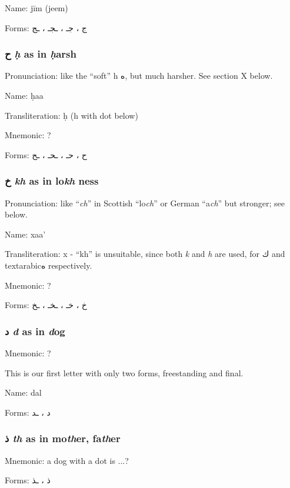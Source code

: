\documentclass[11pt]{article}
\begin{document}
\noindent Name: jīm (jeem)

\noindent Forms: \textarabic{ج ، جـ ، ـجـ ، ـج}

\subsubsection{ \textarabic{ح} \textit{ḥ} as in \textit{ḥ}arsh}
Pronunciation: like the ``soft'' h \textarabic{ه}, but much harsher.
See section X below.

\noindent Name: ḥaa

\noindent Transliteration: ḥ (h with dot below)

\noindent Mnemonic:  ?

\noindent Forms: \textarabic{ح ، حـ ، ـحـ ، ـح}

\subsubsection{ \textarabic{خ} \textit{kh} as in lo\textit{kh} ness}
Pronunciation: like ``\textit{ch}'' in Scottish ``lo\textit{ch}'' or
German ``a\textit{ch}'' but stronger; see below.

\noindent Name: xaa'

\noindent Transliteration: x - ``kh'' is unsuitable, since both
\textit{k} and \textit{h} are used, for \textarabic{ك} and
textarabic{ه} respectively.

\noindent Mnemonic:  ?

\noindent Forms: \textarabic{خ ، خـ ، ـخـ ، ـخ}

\subsubsection{ \textarabic{د} \textit{d} as in \textit{d}og}
Mnemonic:  ?

This is our first letter with only two forms, freestanding and final.

\noindent Name: dal

\noindent Forms: \textarabic{د ، ـد}

\subsubsection{ \textarabic{ذ} \textit{th} as in mo\textit{th}er, fa\textit{th}er}
Mnemonic:  a dog with a dot is ...?

\noindent Forms: \textarabic{ذ ، ـذ}
\end{document}
